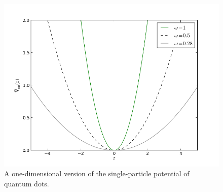 %  
%  
%  
% 
%  
%  

\begin{frame}
 \begin{figure}
 \begin{center}
  \includegraphics[scale=0.4]{../graphics/Potentials/qdots.png}
  \caption{A one-dimensional version of the single-particle potential of quantum dots.}
  \label{fig:extPotQDOTS}
 \end{center}
\end{figure}
\end{frame}

%  
%  
% 
%  
%  

